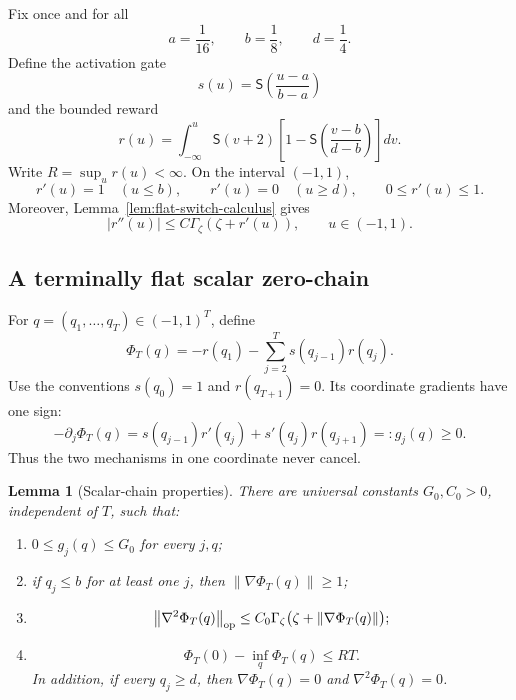 \documentclass[11pt,a4paper]{article}
\newcommand{\norm}[1]{\left\lVert #1\right\rVert}
\newtheorem{lemma}[theorem]{Lemma}
\theoremstyle{remark}
\begin{document}
Fix once and for all
\begin{equation}
 a=\frac1{16},
 \qquad b=\frac18,
 \qquad d=\frac14.
 \label{eq:coarse-chain-thresholds}
\end{equation}
Define the activation gate
\begin{equation}
 s(u)=\mathsf S\!\left(\frac{u-a}{b-a}\right)
 \label{eq:coarse-chain-gate}
\end{equation}
and the bounded reward
\begin{equation}
 r(u)=\int_{-\infty}^{u}
 \mathsf S(v+2)
 \left[1-\mathsf S\!\left(\frac{v-b}{d-b}\right)\right]dv.
 \label{eq:coarse-chain-reward}
\end{equation}
Write $R=\sup_u r(u)<\infty$.  On the interval $(-1,1)$,
\begin{equation}
 r'(u)=1\quad(u\le b),
 \qquad
 r'(u)=0\quad(u\ge d),
 \qquad
 0\le r'(u)\le1.
 \label{eq:reward-plateaux}
\end{equation}
Moreover, Lemma~\ref{lem:flat-switch-calculus} gives
\begin{equation}
 |r''(u)|\le C\Gamma_\zeta(\zeta+r'(u)),
 \qquad u\in(-1,1).
 \label{eq:reward-log-derivative}
\end{equation}

\subsection{A terminally flat scalar zero-chain}

For $q=(q_1,\ldots,q_T)\in(-1,1)^T$, define
\begin{equation}
 \Phi_T(q)
 =-r(q_1)-\sum_{j=2}^{T}s(q_{j-1})r(q_j).
 \label{eq:terminal-flat-scalar-chain}
\end{equation}
Use the conventions $s(q_0)=1$ and $r(q_{T+1})=0$.  Its coordinate
gradients have one sign:
\begin{equation}
 -\partial_j\Phi_T(q)
 =s(q_{j-1})r'(q_j)+s'(q_j)r(q_{j+1})
 =:g_j(q)\ge0.
 \label{eq:scalar-chain-gradient}
\end{equation}
Thus the two mechanisms in one coordinate never cancel.

\begin{lemma}[Scalar-chain properties]
\label{lem:scalar-chain-properties}
There are universal constants $G_0,C_0>0$, independent of $T$, such that:
\begin{enumerate}
\item $0\le g_j(q)\le G_0$ for every $j,q$;
\item if $q_j\le b$ for at least one $j$, then
      $\norm{\nabla\Phi_T(q)}\ge1$;
\item
\begin{equation}
 \norm{\nabla^2\Phi_T(q)}_{\rm op}
 \le C_0\Gamma_\zeta
       \bigl(\zeta+\norm{\nabla\Phi_T(q)}\bigr);
 \label{eq:scalar-chain-certificate}
\end{equation}
\item
\begin{equation}
 \Phi_T(0)-\inf_q\Phi_T(q)\le RT.
 \label{eq:scalar-chain-gap}
\end{equation}
In addition, if every $q_j\ge d$, then
$\nabla\Phi_T(q)=0$ and $\nabla^2\Phi_T(q)=0$.
\end{enumerate}
\end{lemma}
\end{document}
